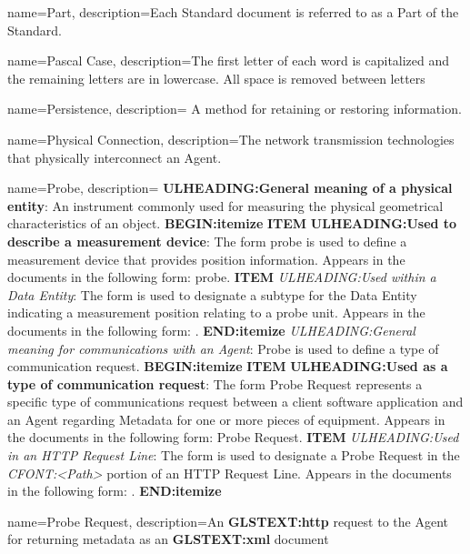 {
    name={Part},
	description={Each Standard document is referred to as a \gls{Part} of the Standard.}
}

{
    name={Pascal Case},
	description={The first letter of each word is capitalized and the remaining letters are in lowercase. All space is removed between letters}
}

{
    name={Persistence},
	description={
	A method for retaining or restoring information.
}
}

{
    name={Physical Connection},
	description={The network transmission technologies that physically interconnect an \gls{Agent}.}
}

{
    name={Probe},
	description={
	\textbf{ULHEADING:General meaning of a physical entity}:
	An instrument commonly used for measuring the physical geometrical characteristics of an object.
    \textbf{BEGIN:itemize}
	\textbf{ITEM} \textbf{ULHEADING:Used to describe a measurement device}:
	The form probe is used to define a measurement device that provides position information.
	Appears in the documents in the following form: probe. 
	\textbf{ITEM} \textit{ULHEADING:Used within a \gls{Data Entity}}:
	The form  is used to designate a subtype for the \gls{Data Entity}  indicating a measurement position relating to a probe unit.
	Appears in the documents in the following form: .
    \textbf{END:itemize}
	\textit{ULHEADING:General meaning for communications with an \gls{Agent}}:
	Probe is used to define a type of communication request. 
    \textbf{BEGIN:itemize}
	\textbf{ITEM} \textbf{ULHEADING:Used as a type of communication request}:
	The form \gls{Probe Request} represents a specific type of communications request between a client software application and an \gls{Agent} regarding \gls{Metadata} for one or more pieces of equipment.
	Appears in the documents in the following form: \gls{Probe Request}.
	\textbf{ITEM} \textit{ULHEADING:Used in an \gls{HTTP Request Line}}:
	The form  is used to designate a \gls{Probe Request} in the \textit{CFONT:<Path>} portion of an \gls{HTTP Request Line}.
	Appears in the documents in the following form: .
    \textbf{END:itemize}
}
}

{
    name={Probe Request},
	description={An \textbf{GLSTEXT:http} request to the \gls{Agent} for returning metadata as an  \textbf{GLSTEXT:xml} document}
}


